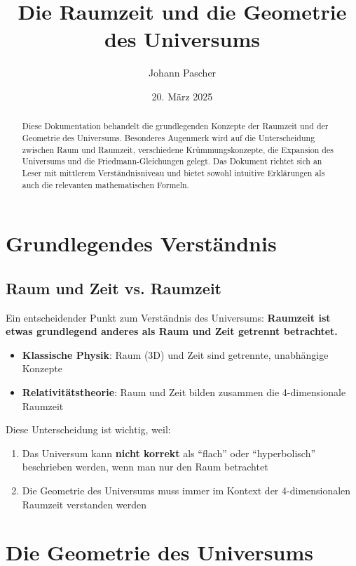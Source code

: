 \documentclass[a4paper,12pt]{article}
\title{Die Raumzeit und die Geometrie des Universums}
\author{Johann Pascher}
\date{20. März 2025}
\begin{document}
	
	\maketitle
	
	\begin{abstract}
		Diese Dokumentation behandelt die grundlegenden Konzepte der Raumzeit und der Geometrie des Universums. Besonderes Augenmerk wird auf die Unterscheidung zwischen Raum und Raumzeit, verschiedene Krümmungskonzepte, die Expansion des Universums und die Friedmann-Gleichungen gelegt. Das Dokument richtet sich an Leser mit mittlerem Verständnisniveau und bietet sowohl intuitive Erklärungen als auch die relevanten mathematischen Formeln.
	\end{abstract}
	
	\tableofcontents
	
	\section{Grundlegendes Verständnis}
	
	\subsection{Raum und Zeit vs. Raumzeit}
	
	Ein entscheidender Punkt zum Verständnis des Universums: \textbf{Raumzeit ist etwas grundlegend anderes als Raum und Zeit getrennt betrachtet.}
	
	\begin{itemize}
		\item \textbf{Klassische Physik}: Raum (3D) und Zeit sind getrennte, unabhängige Konzepte
		\item \textbf{Relativitätstheorie}: Raum und Zeit bilden zusammen die 4-dimensionale Raumzeit
	\end{itemize}
	
	Diese Unterscheidung ist wichtig, weil:
	\begin{enumerate}
		\item Das Universum kann \textbf{nicht korrekt} als ``flach'' oder ``hyperbolisch'' beschrieben werden, wenn man nur den Raum betrachtet
		\item Die Geometrie des Universums muss immer im Kontext der 4-dimensionalen Raumzeit verstanden werden
	\end{enumerate}
	
	\section{Die Geometrie des Universums}
	
\end{document}
